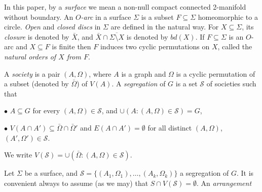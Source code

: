 In this paper, by a \textit{surface} we mean a non-null compact connected 2-manifold without boundary. An \textit{$O$-arc} in a surface $\Sigma$ is a subset $F \subseteq \Sigma$ homeomorphic to a circle. \textit{Open} and \textit{closed discs} in $\Sigma$ are defined in the natural way. For $X \subseteq \Sigma$, its \textit{closure} is denoted by $\bar{X}$, and $\bar{X} \cap \overline{\Sigma \setminus X}$ is denoted by $bd(X)$. If $F \subseteq \Sigma$ is an $O$-arc and $X \subseteq F$ is finite then $F$ induces two cyclic permutations on $X$, called the \textit{natural orders of $X$ from $F$}.

A \textit{society} is a pair $(A, \Omega)$, where $A$ is a graph and $\Omega$ is a cyclic permutation of a subset (denoted by $\bar{\Omega}$) of $V(A)$. A \textit{segregation} of $G$ is a set $\mathscr{S}$ of societies such that

\hspace*{12pt}$\bullet$ $A \subseteq G$ for every $(A, \Omega) \in \mathscr{S}$, and $\cup(A \colon (A, \Omega) \in \mathscr{S}) = G$,

\hspace*{12pt}$\bullet$ $V(A \cap A') \subseteq \bar{\Omega} \cap \bar{\Omega}'$ and $E(A \cap A') = \emptyset$ for all distinct $(A, \Omega)$, $(A', \Omega') \in \mathscr{S}$.

We write $V(\mathscr{S}) = \cup(\bar{\Omega} \colon (A, \Omega) \in \mathscr{S})$.

Let $\Sigma$ be a surface, and $\mathscr{S} = \{(A_1, \Omega_1), \ldots, (A_k, \Omega_k)\}$ a segregation of $G$. It is convenient always to assume (as we may) that $S \cap V(\mathscr{S}) = \emptyset$. An \textit{arrangement}
